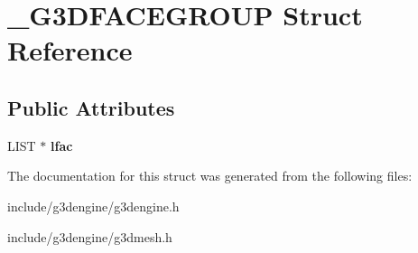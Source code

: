 \hypertarget{struct__G3DFACEGROUP}{}\section{\+\_\+\+G3\+D\+F\+A\+C\+E\+G\+R\+O\+UP Struct Reference}
\label{struct__G3DFACEGROUP}
\subsection*{Public Attributes}
\begin{DoxyCompactItemize}
\item 
\mbox{\label{struct__G3DFACEGROUP_a0a74470a30ce1b9cf29ab6950409a63c}} 
L\+I\+ST $\ast$ {\bfseries lfac}
\end{DoxyCompactItemize}


The documentation for this struct was generated from the following files\+:\begin{DoxyCompactItemize}
\item 
include/g3dengine/g3dengine.\+h\item 
include/g3dengine/g3dmesh.\+h\end{DoxyCompactItemize}
